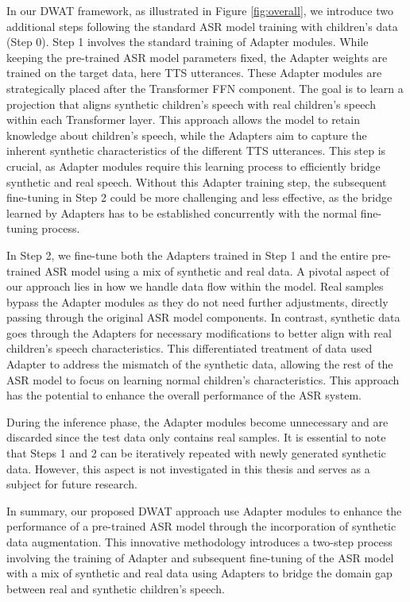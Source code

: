 In our \ac{DWAT}  framework, as illustrated in Figure \ref{fig:overall}, we introduce two additional steps following the standard \ac{ASR} model training with children's data (Step 0).
Step 1 involves the standard training of Adapter modules. While keeping the pre-trained \ac{ASR} model parameters fixed, the Adapter weights are trained on the target data, here \ac{TTS} utterances. These Adapter modules are strategically placed after the Transformer \ac{FFN} component. The goal is to learn a projection that aligns synthetic children's speech with real children's speech within each Transformer layer. This approach allows the model to retain knowledge about children's speech, while the Adapters aim to capture the inherent synthetic characteristics of the different \ac{TTS} utterances. This step is crucial, as Adapter modules require this learning process to efficiently bridge synthetic and real speech. Without this Adapter training step, the subsequent fine-tuning in Step 2 could be more challenging and less effective, as the bridge learned by Adapters has to be established concurrently with the normal fine-tuning process.

In Step 2, we fine-tune both the Adapters trained in Step 1 and the entire pre-trained \ac{ASR} model using a mix of synthetic and real data. A pivotal aspect of our approach lies in how we handle data flow within the model. Real samples bypass the Adapter modules as they do not need further adjustments, directly passing through the original \ac{ASR} model components. In contrast, synthetic data goes through the Adapters for necessary modifications to better align with real children's speech characteristics. This differentiated treatment of data used Adapter to address the mismatch of the synthetic data, allowing the rest of the \ac{ASR} model to focus on learning normal children's characteristics. This approach has the potential to enhance the overall performance of the \ac{ASR} system.

During the inference phase, the Adapter modules become unnecessary and are discarded since the test data only contains real samples. It is essential to note that Steps 1 and 2 can be iteratively repeated with newly generated synthetic data. However, this aspect is not investigated in this thesis and serves as a subject for future research.

In summary, our proposed \ac{DWAT} approach use Adapter modules to enhance the performance of a pre-trained \ac{ASR} model through the incorporation of synthetic data augmentation. This innovative methodology introduces a two-step process involving the training of Adapter and subsequent fine-tuning of the \ac{ASR} model with a mix of synthetic and real data using Adapters to bridge the domain gap between real and synthetic children's speech.


